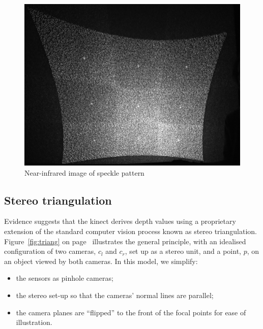 \begin{figure}[ht]
    \begin{center}
        \includegraphics[width=1.0\textwidth]{images/whole_pattern.pdf}
        \caption{Near-infrared image of speckle pattern}
        \label{fig:pattern1}
    \end{center}
\end{figure}


\subsection{Stereo triangulation}
\label{sub:triang}

Evidence suggests that the kinect derives depth values using a proprietary
extension of the standard computer vision process known as stereo triangulation.
Figure~\ref{fig:triang} on page~\pageref{fig:triang} illustrates the general
principle, with an idealised configuration of two cameras, $c_{l}$ and $c_{r}$,
set up as a stereo unit, and a point, $p$, on an object viewed by both cameras.
In this model, we simplify: \begin{itemize}

    \item   the sensors as pinhole cameras;

    \item   the stereo set-up so that the cameras' normal lines are parallel;

    \item   the camera planes are ``flipped'' to the front of the focal points
    for ease of illustration.

\end{itemize}

